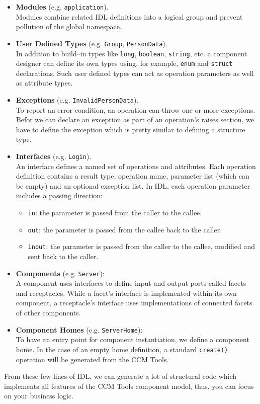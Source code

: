 \begin{itemize}
\item {\bf Modules} (e.g. {\tt application}).\\
Modules combine related IDL definitions into a logical group and prevent
pollution of the global namespace.  
   
\item {\bf User Defined Types} (e.g. {\tt Group}, {\tt PersonData}). \\
In addition to build--in types like {\tt long}, {\tt boolean}, {\tt string}, etc. a 
component designer can define its own types using, for example, {\tt enum} and {\tt struct} declarations.
Such user defined types can act as operation parameters as well as attribute types. 

\item {\bf Exceptions} (e.g. {\tt InvalidPersonData}). \\
To report an error condition, an operation can throw one or more exceptions. 
Befor we can declare an exception as part of an operation's raises section, we have to
define the exception which is pretty similar to defining a structure type.

\item {\bf Interfaces} (e.g. {\tt Login}). \\
An interface defines a named set of operations and attributes.
Each operation definition contains a result type, operation name, 
parameter list (which can be empty) and an optional exception list.
In IDL, each operation parameter includes a passing direction:
	\begin{itemize}
	\item {\tt in}: the parameter is passed from the caller to the 
					callee.
	\item {\tt out}: the parameter is passed from the callee back 
					to the caller.
	\item {\tt inout}: the parameter is passed from the caller to 
					the callee, modified and sent back to the caller.
	\end{itemize}


\item {\bf Components} (e.g. {\tt Server}): \\
A component uses interfaces to define input and output ports called facets 
and receptacles. 
While a facet's interface is implemented within its own component, a 
receptacle's interface uses implementations of connected facets of other 
components.


\item {\bf Component Homes} (e.g. {\tt ServerHome}): \\
To have an entry point for component instantiation, we define a component 
home. In the case of an empty home definition, a standard {\tt create()} 
operation will be generated from the CCM Tools.
\end{itemize}

From these few lines of IDL, we can generate a lot of structural code which 
implements all features of the CCM Tools component model, thus, you can 
focus on your business logic.

\newpage
